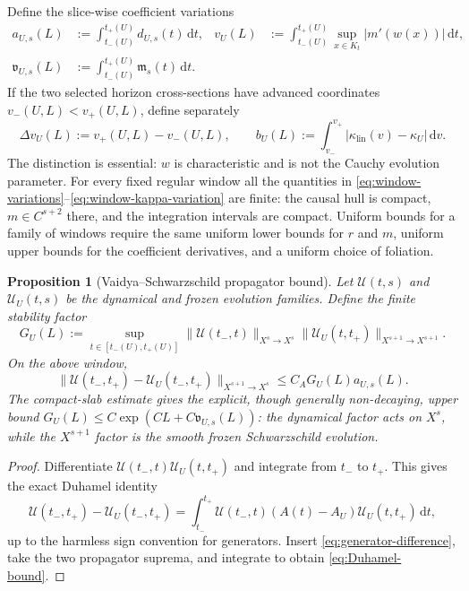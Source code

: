 \documentclass[11pt,a4paper]{article}
\newtheorem{proposition}[theorem]{Proposition}
\theoremstyle{definition}
\theoremstyle{remark}
\newcommand{\dd}{\mathrm d}
\begin{document}
	Define the slice-wise coefficient variations
	\begin{align}
		a_{U,s}(L)&:=\int_{t_-(U)}^{t_+(U)}d_{U,s}(t)\,\dd t,
		&v_U(L)&:=\int_{t_-(U)}^{t_+(U)}
		\sup_{x\in K_t}|m'(w(x))|\,\dd t,
		\label{eq:window-variations}\\
		\mathfrak v_{U,s}(L)&:=\int_{t_-(U)}^{t_+(U)}\mathfrak m_s(t)\,\dd t.
		\label{eq:window-high-variation}
	\end{align}
	If the two selected horizon cross-sections have advanced coordinates
	$v_-(U,L)<v_+(U,L)$, define separately
	\begin{equation}
		\Delta v_U(L):=v_+(U,L)-v_-(U,L),\qquad
		b_U(L):=\int_{v_-}^{v_+}
		|\kappa_{\mathrm{lin}}(v)-\kappa_U|\,\dd v.
		\label{eq:window-kappa-variation}
	\end{equation}
	The distinction is essential: $w$ is characteristic and is not the Cauchy
	evolution parameter.  For every fixed regular window all the quantities in
	\eqref{eq:window-variations}--\eqref{eq:window-kappa-variation} are finite:
	the causal hull is compact, $m\in C^{s+2}$ there, and the integration
	intervals are compact.  Uniform bounds for a family of windows require the
	same uniform lower bounds for $r$ and $m$, uniform upper bounds for the
	coefficient derivatives, and a uniform choice of foliation.
	
	\begin{proposition}[Vaidya--Schwarzschild propagator bound]
		\label{prop:Duhamel}
		Let $\mathcal U(t,s)$ and $\mathcal U_U(t,s)$ be the dynamical and frozen
		evolution families.  Define the finite stability factor
		\begin{equation}
			G_U(L):=\sup_{t\in[t_-(U),t_+(U)]}
			\|\mathcal U(t_-,t)\|_{X^s\to X^s}
			\|\mathcal U_U(t,t_+)\|_{X^{s+1}\to X^{s+1}}.
			\label{eq:stability-factor}
		\end{equation}
		On the above window,
		\begin{equation}
			\|\mathcal U(t_-,t_+)-\mathcal U_U(t_-,t_+)\|_{X^{s+1}\to X^s}
			\leq C_A G_U(L)a_{U,s}(L).
			\label{eq:Duhamel-bound}
		\end{equation}
		The compact-slab estimate gives the explicit, though generally non-decaying,
		upper bound $G_U(L)\leq C\exp(C L+C\mathfrak v_{U,s}(L))$: the dynamical
		factor acts on $X^s$, while the $X^{s+1}$ factor is the smooth frozen
		Schwarzschild evolution.
	\end{proposition}
	
	\begin{proof}
		Differentiate
		$\mathcal U(t_-,t)\mathcal U_U(t,t_+)$ and integrate from $t_-$ to $t_+$.
		This gives the exact Duhamel identity
		\begin{equation}
			\mathcal U(t_-,t_+)-\mathcal U_U(t_-,t_+)
			=\int_{t_-}^{t_+}\mathcal U(t_-,t)
			(A(t)-A_U)\mathcal U_U(t,t_+)\,\dd t,
		\end{equation}
		up to the harmless sign convention for generators.  Insert
		\eqref{eq:generator-difference}, take the two propagator suprema, and integrate
		to obtain
		\eqref{eq:Duhamel-bound}.
	\end{proof}
	
\end{document}
